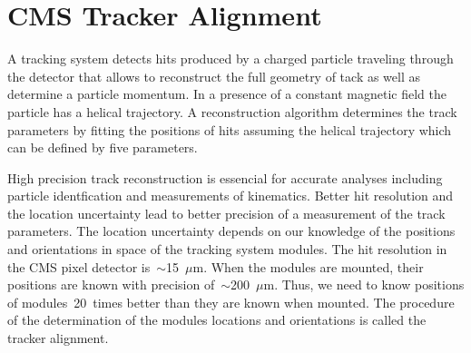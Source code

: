 \chapter{CMS Tracker Alignment} %
\label{sec:alignment}
A tracking system detects hits produced by a charged particle traveling through the detector that allows to reconstruct the full geometry of tack as well as determine a particle momentum. In a presence of a constant magnetic field the particle has a helical trajectory. A reconstruction algorithm determines the track parameters by fitting the positions of hits assuming the helical trajectory which can be defined by five parameters.

High precision track reconstruction is essencial for accurate analyses including particle identfication and measurements of kinematics. Better hit resolution and the location uncertainty lead to better precision of a measurement of the track parameters. The location uncertainty depends on our knowledge of the positions and orientations in space of the tracking system modules. The hit resolution in the CMS pixel detector is~$\sim$15~$\mu$m. When the modules are mounted, their positions are known with precision of~$\sim$200~$\mu$m. Thus, we need to know positions of modules~20~times better than they are known when mounted. The procedure of the determination of the modules locations and orientations is called the tracker alignment.

